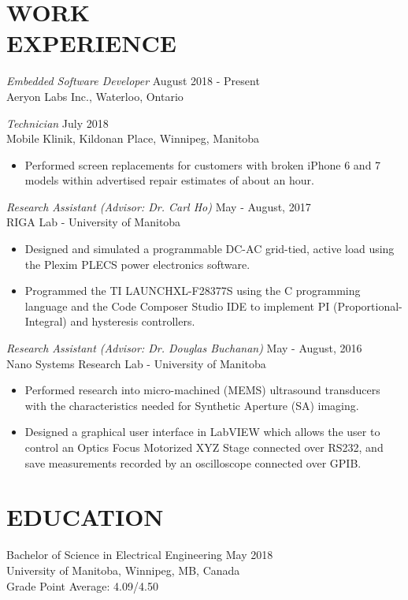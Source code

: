 \documentclass[margin]{res}
\begin{document}
\begin{resume}

\section{WORK \\ EXPERIENCE} 
{\sl Embedded Software Developer} \hfill August 2018 - Present \\
Aeryon Labs Inc., Waterloo, Ontario

{\sl Technician} \hfill July 2018 \\
Mobile Klinik, Kildonan Place, Winnipeg, Manitoba
\begin{itemize} \itemsep -0pt 
	\item Performed screen replacements for customers with broken iPhone 6 and 7 models within advertised repair estimates of about an hour.
\end{itemize}

{\sl Research Assistant (Advisor: Dr. Carl Ho)} \hfill May - August, 2017 \\
RIGA Lab - University of Manitoba
\begin{itemize} \itemsep -0pt 
	\item Designed and simulated a programmable DC-AC grid-tied, active load using the Plexim PLECS power electronics software.
	\item Programmed the TI LAUNCHXL-F28377S using the C programming language and the Code Composer Studio IDE to implement PI (Proportional-Integral) and hysteresis controllers.
\end{itemize}

{\sl Research Assistant (Advisor: Dr. Douglas Buchanan)} \hfill May - August, 2016 \\
Nano Systems Research Lab - University of Manitoba
\begin{itemize} \itemsep -0pt 
	\item Performed research into micro-machined (MEMS) ultrasound transducers with the characteristics needed for Synthetic Aperture (SA) imaging.
	\item Designed a graphical user interface in LabVIEW which allows the user to control an Optics Focus Motorized XYZ Stage connected over RS232, and save measurements recorded by an oscilloscope connected over GPIB.
\end{itemize}

\section{EDUCATION} 
Bachelor of Science in Electrical Engineering \hfill May 2018 \\
University of Manitoba, Winnipeg, MB, Canada \\	
Grade Point Average: 4.09/4.50 


\end{resume}
\end{document}
